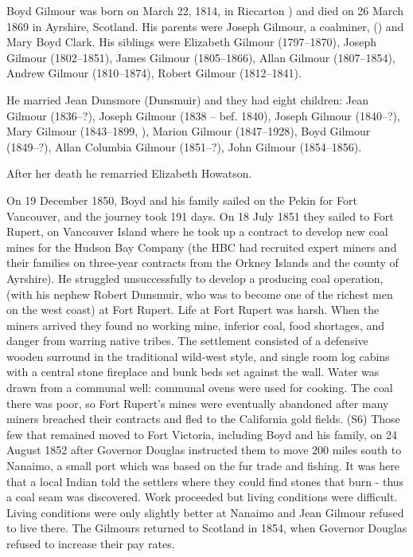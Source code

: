 
Boyd Gilmour was born on March 22, 1814, in Riccarton \cite{BGbirth}) and died on 26 March 1869 in Ayrshire, Scotland.
His parents were Joseph Gilmour, a coalminer, () and Mary Boyd Clark. His siblings were Elizabeth Gilmour (1797--1870), Joseph Gilmour (1802--1851),
James Gilmour (1805--1866), Allan Gilmour (1807--1854), Andrew Gilmour (1810--1874), Robert Gilmour (1812--1841).

He married Jean Dunsmore (Dunsmuir) and they had eight children:  Jean Gilmour (1836--?), Joseph Gilmour (1838 -- bef. 1840),\cite{JGbirth} Joseph Gilmour (1840--?), Mary Gilmour (1843--1899, ), Marion Gilmour (1847--1928), Boyd Gilmour (1849--?), Allan Columbia Gilmour (1851--?), John Gilmour (1854--1856).

After her death he remarried Elizabeth Howatson.

On 19 December 1850, Boyd and his family sailed on the Pekin for Fort Vancouver, and the journey took 191 days. On 18 July 1851 they sailed to Fort Rupert, on Vancouver Island where he took up a contract to develop new coal mines for the Hudson Bay Company (the HBC had recruited expert miners and their families on three-year contracts from the Orkney Islands and the county of Ayrshire). He struggled unsuccessfully to develop a producing coal operation, (with his nephew Robert Dunsmuir, who was to become one of the richest men on the west coast) at Fort Rupert. Life at Fort Rupert was harsh. When the miners arrived they found no working mine, inferior coal, food shortages, and danger from warring native tribes. The settlement consisted of a defensive wooden surround in the traditional wild-west style, and single room log cabins with a central stone fireplace and bunk beds set against the wall. Water was drawn from a communal well: communal ovens were used for cooking. The coal there was poor, so Fort Rupert’s mines were eventually abandoned after many miners breached their contracts and fled to the California gold fields. (S6) Those few that remained moved to Fort Victoria, including Boyd and his family, on 24 August 1852 after Governor Douglas instructed them to move 200 miles south to Nanaimo, a small port which was based on the fur trade and fishing. It was here that a local Indian told the settlers where they could find stones that burn - thus a coal seam was discovered. Work proceeded but living conditions were difficult. Living conditions were only slightly better at Nanaimo and Jean Gilmour refused to live there. The Gilmours returned to Scotland in 1854, when Governor Douglas refused to increase their pay rates.

